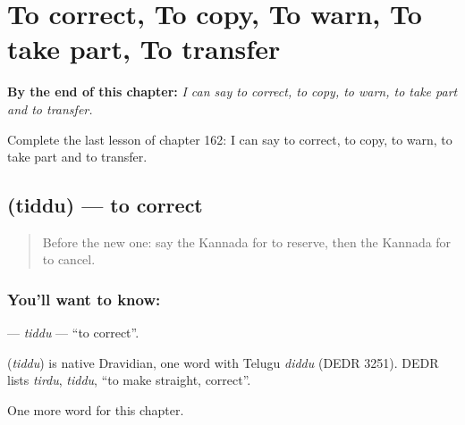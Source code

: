 
\chapter{To correct, To copy, To warn, To take part, To transfer}
\label{ch:ka-to-correct-to-copy-to-warn-to-take-part-to-transfer}

\begin{chapteropening}
\textbf{By the end of this chapter:} \emph{I can say to correct, to copy, to warn, to take part and to transfer.}

Complete the last lesson of chapter 162: I can say to correct, to copy, to warn, to take part and to transfer.
\end{chapteropening}

\section[\texorpdfstring{\kn{ತಿದ್ದು} (tiddu)}{ತಿದ್ದು (tiddu)}]{ (tiddu) — to correct}

\label{lesson:KA-C162-tiddu}



\begin{quote}
Before the new one: say the Kannada for to reserve, then the Kannada for to cancel.
\end{quote}

\subsection*{You'll want to know: }
\textbf{} — \emph{tiddu} — \textquotedblleft{}to correct\textquotedblright{}.

\begin{cousinweb}
\textbf{} (\emph{tiddu}) is native Dravidian, one word with Telugu \emph{diddu} (DEDR 3251). DEDR lists \emph{tirdu}, \emph{tiddu}, \textquotedblleft{}to make straight, correct\textquotedblright{}.
\end{cousinweb}

\begin{grammarlens}[title={What you've built}]
One more word for this chapter.
\end{grammarlens}

